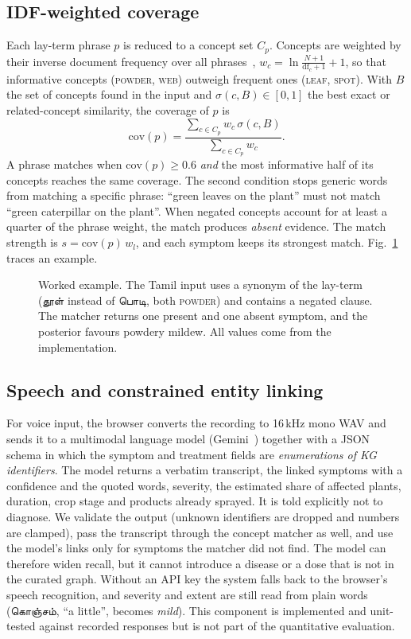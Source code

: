 \documentclass[conference]{IEEEtran}
\newcommand{\ta}[1]{{\tamilfont #1}}
\begin{document}
\subsection{IDF-weighted coverage}
Each lay-term phrase $p$ is reduced to a concept set $C_p$. Concepts are weighted by their inverse document frequency over all phrases~\cite{sparckjones1972}, $w_c = \ln\frac{N+1}{\mathrm{df}_c+1}+1$, so that informative concepts (\textsc{powder}, \textsc{web}) outweigh frequent ones (\textsc{leaf}, \textsc{spot}). With $B$ the set of concepts found in the input and $\sigma(c,B)\in[0,1]$ the best exact or related-concept similarity, the coverage of $p$ is
\begin{equation}
  \mathrm{cov}(p) = \frac{\sum_{c\in C_p} w_c\, \sigma(c,B)}{\sum_{c\in C_p} w_c}.
  \label{eq:cov}
\end{equation}
A phrase matches when $\mathrm{cov}(p)\geq 0.6$ \emph{and} the most informative half of its concepts reaches the same coverage. The second condition stops generic words from matching a specific phrase: ``green leaves on the plant'' must not match ``green caterpillar on the plant''. When negated concepts account for at least a quarter of the phrase weight, the match produces \emph{absent} evidence. The match strength is $s=\mathrm{cov}(p)\,w_l$, and each symptom keeps its strongest match. Fig.~\ref{fig:nlu} traces an example.

\begin{figure}[t]
  \centering
  \resizebox{\columnwidth}{!}{}
  \caption{Worked example. The Tamil input uses a synonym of the lay-term (\ta{தூள்} instead of \ta{பொடி}, both \textsc{powder}) and contains a negated clause. The matcher returns one present and one absent symptom, and the posterior favours powdery mildew. All values come from the implementation.}
  \label{fig:nlu}
\end{figure}

\subsection{Speech and constrained entity linking}
For voice input, the browser converts the recording to 16\,kHz mono WAV and sends it to a multimodal language model (Gemini~\cite{gemini2023}) together with a JSON schema in which the symptom and treatment fields are \emph{enumerations of KG identifiers}. The model returns a verbatim transcript, the linked symptoms with a confidence and the quoted words, severity, the estimated share of affected plants, duration, crop stage and products already sprayed. It is told explicitly not to diagnose. We validate the output (unknown identifiers are dropped and numbers are clamped), pass the transcript through the concept matcher as well, and use the model's links only for symptoms the matcher did not find. The model can therefore widen recall, but it cannot introduce a disease or a dose that is not in the curated graph. Without an API key the system falls back to the browser's speech recognition, and severity and extent are still read from plain words (\ta{கொஞ்சம்}, ``a little'', becomes \emph{mild}). This component is implemented and unit-tested against recorded responses but is not part of the quantitative evaluation.
\end{document}
